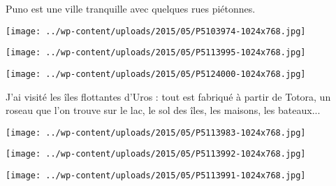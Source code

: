 Puno est une ville tranquille avec quelques rues piétonnes. 
\begin{center} \texttt{[image: ../wp-content/uploads/2015/05/P5103974-1024x768.jpg]} \end{center}
\begin{center} \texttt{[image: ../wp-content/uploads/2015/05/P5113995-1024x768.jpg]} \end{center}
\begin{center} \texttt{[image: ../wp-content/uploads/2015/05/P5124000-1024x768.jpg]} \end{center}
\pagebreak

J'ai visité les îles flottantes d'Uros : tout est fabriqué à partir de Totora, un roseau que l'on trouve sur le lac, le sol des îles, les maisons, les bateaux...
\begin{center} \texttt{[image: ../wp-content/uploads/2015/05/P5113983-1024x768.jpg]} \end{center}
\begin{center} \texttt{[image: ../wp-content/uploads/2015/05/P5113992-1024x768.jpg]} \end{center}
\begin{center} \texttt{[image: ../wp-content/uploads/2015/05/P5113991-1024x768.jpg]} \end{center}
